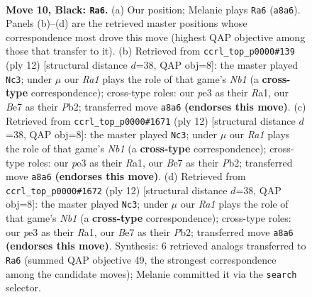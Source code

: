 \documentclass[11pt]{article}
\begin{document}
\clearpage

\begin{figure}[p]\centering
\begin{subfigure}{0.46\textwidth}\centering
\resizebox{\linewidth}{!}{%
\newchessgame
\chessboard[
  setfen={rnbq1rk1/1p2bp1p/5np1/p1pp4/P7/1P2PNP1/3P1PBP/RNBQ1RK1 b - - 0 10},
  showmover=false,
  pgfstyle=straightmove, color=movearrow, markmove={a8-a6}
]}
\caption{}
\end{subfigure}\hfill
\begin{subfigure}{0.46\textwidth}\centering
\resizebox{\linewidth}{!}{%
\newchessgame
\chessboard[
  setfen={rnbq1rk1/pp2ppbp/2pp1np1/8/2PP4/5NP1/PP2PPBP/RNBQ1RK1 w - - 0 7},
  showmover=false,
  pgfstyle=straightmove, color=movearrow, markmove={b1-c3}
]}
\caption{}
\end{subfigure}
\\[4pt]
\begin{subfigure}{0.46\textwidth}\centering
\resizebox{\linewidth}{!}{%
\newchessgame
\chessboard[
  setfen={rnbq1rk1/pp2ppbp/2pp1np1/8/2PP4/5NP1/PP2PPBP/RNBQ1RK1 w - - 0 7},
  showmover=false,
  pgfstyle=straightmove, color=movearrow, markmove={b1-c3}
]}
\caption{}
\end{subfigure}\hfill
\begin{subfigure}{0.46\textwidth}\centering
\resizebox{\linewidth}{!}{%
\newchessgame
\chessboard[
  setfen={rnbq1rk1/pp2ppbp/2pp1np1/8/2PP4/5NP1/PP2PPBP/RNBQ1RK1 w - - 0 7},
  showmover=false,
  pgfstyle=straightmove, color=movearrow, markmove={b1-c3}
]}
\caption{}
\end{subfigure}
\caption{\textbf{Move 10, Black: \texttt{Ra6}.} (a) Our position; Melanie plays \texttt{Ra6} (\texttt{a8a6}). Panels (b)--(d) are the retrieved master positions whose correspondence most drove this move (highest QAP objective among those that transfer to it). (b) Retrieved from \texttt{ccrl\_top\_p0000\#139} (ply 12) [structural distance $d$=38, QAP obj=8]: the master played \texttt{Nc3}; under $\mu$ our \emph{Ra1} plays the role of that game's \emph{Nb1} (a \textbf{cross-type} correspondence); cross-type roles: our \emph{p}e3 as their \emph{R}a1, our \emph{B}e7 as their \emph{P}b2; transferred move \texttt{a8a6} \textbf{(endorses this move)}. (c) Retrieved from \texttt{ccrl\_top\_p0000\#1671} (ply 12) [structural distance $d$=38, QAP obj=8]: the master played \texttt{Nc3}; under $\mu$ our \emph{Ra1} plays the role of that game's \emph{Nb1} (a \textbf{cross-type} correspondence); cross-type roles: our \emph{p}e3 as their \emph{R}a1, our \emph{B}e7 as their \emph{P}b2; transferred move \texttt{a8a6} \textbf{(endorses this move)}. (d) Retrieved from \texttt{ccrl\_top\_p0000\#1672} (ply 12) [structural distance $d$=38, QAP obj=8]: the master played \texttt{Nc3}; under $\mu$ our \emph{Ra1} plays the role of that game's \emph{Nb1} (a \textbf{cross-type} correspondence); cross-type roles: our \emph{p}e3 as their \emph{R}a1, our \emph{B}e7 as their \emph{P}b2; transferred move \texttt{a8a6} \textbf{(endorses this move)}. Synthesis: 6 retrieved analogs transferred to \texttt{Ra6} (summed QAP objective 49, the strongest correspondence among the candidate moves); Melanie committed it via the \texttt{search} selector.}
\label{fig:thought-m19}
\end{figure}
\end{document}
